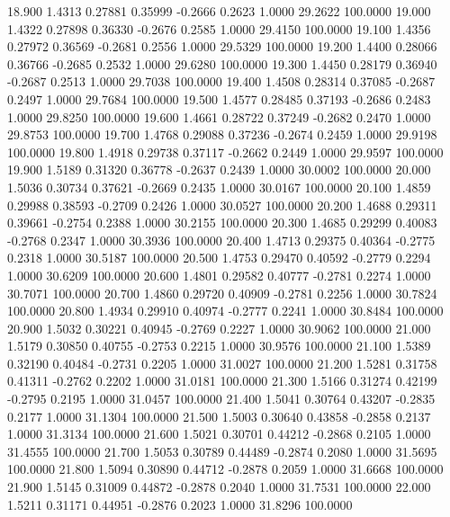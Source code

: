   18.900   1.4313   0.27881   0.35999  -0.2666   0.2623   1.0000  29.2622 100.0000
  19.000   1.4322   0.27898   0.36330  -0.2676   0.2585   1.0000  29.4150 100.0000
  19.100   1.4356   0.27972   0.36569  -0.2681   0.2556   1.0000  29.5329 100.0000
  19.200   1.4400   0.28066   0.36766  -0.2685   0.2532   1.0000  29.6280 100.0000
  19.300   1.4450   0.28179   0.36940  -0.2687   0.2513   1.0000  29.7038 100.0000
  19.400   1.4508   0.28314   0.37085  -0.2687   0.2497   1.0000  29.7684 100.0000
  19.500   1.4577   0.28485   0.37193  -0.2686   0.2483   1.0000  29.8250 100.0000
  19.600   1.4661   0.28722   0.37249  -0.2682   0.2470   1.0000  29.8753 100.0000
  19.700   1.4768   0.29088   0.37236  -0.2674   0.2459   1.0000  29.9198 100.0000
  19.800   1.4918   0.29738   0.37117  -0.2662   0.2449   1.0000  29.9597 100.0000
  19.900   1.5189   0.31320   0.36778  -0.2637   0.2439   1.0000  30.0002 100.0000
  20.000   1.5036   0.30734   0.37621  -0.2669   0.2435   1.0000  30.0167 100.0000
  20.100   1.4859   0.29988   0.38593  -0.2709   0.2426   1.0000  30.0527 100.0000
  20.200   1.4688   0.29311   0.39661  -0.2754   0.2388   1.0000  30.2155 100.0000
  20.300   1.4685   0.29299   0.40083  -0.2768   0.2347   1.0000  30.3936 100.0000
  20.400   1.4713   0.29375   0.40364  -0.2775   0.2318   1.0000  30.5187 100.0000
  20.500   1.4753   0.29470   0.40592  -0.2779   0.2294   1.0000  30.6209 100.0000
  20.600   1.4801   0.29582   0.40777  -0.2781   0.2274   1.0000  30.7071 100.0000
  20.700   1.4860   0.29720   0.40909  -0.2781   0.2256   1.0000  30.7824 100.0000
  20.800   1.4934   0.29910   0.40974  -0.2777   0.2241   1.0000  30.8484 100.0000
  20.900   1.5032   0.30221   0.40945  -0.2769   0.2227   1.0000  30.9062 100.0000
  21.000   1.5179   0.30850   0.40755  -0.2753   0.2215   1.0000  30.9576 100.0000
  21.100   1.5389   0.32190   0.40484  -0.2731   0.2205   1.0000  31.0027 100.0000
  21.200   1.5281   0.31758   0.41311  -0.2762   0.2202   1.0000  31.0181 100.0000
  21.300   1.5166   0.31274   0.42199  -0.2795   0.2195   1.0000  31.0457 100.0000
  21.400   1.5041   0.30764   0.43207  -0.2835   0.2177   1.0000  31.1304 100.0000
  21.500   1.5003   0.30640   0.43858  -0.2858   0.2137   1.0000  31.3134 100.0000
  21.600   1.5021   0.30701   0.44212  -0.2868   0.2105   1.0000  31.4555 100.0000
  21.700   1.5053   0.30789   0.44489  -0.2874   0.2080   1.0000  31.5695 100.0000
  21.800   1.5094   0.30890   0.44712  -0.2878   0.2059   1.0000  31.6668 100.0000
  21.900   1.5145   0.31009   0.44872  -0.2878   0.2040   1.0000  31.7531 100.0000
  22.000   1.5211   0.31171   0.44951  -0.2876   0.2023   1.0000  31.8296 100.0000
